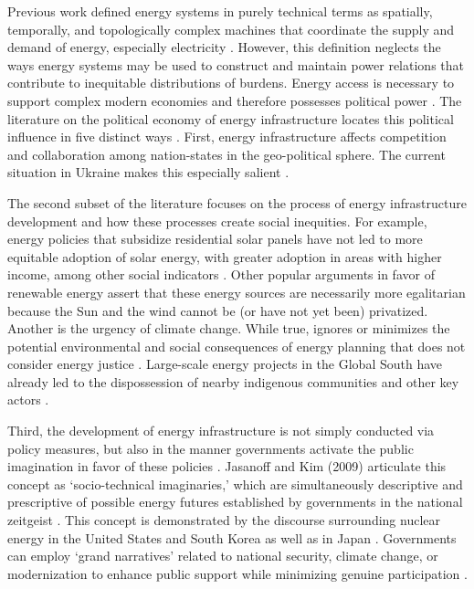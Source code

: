 Previous work defined energy systems in purely technical terms as spatially,
temporally, and topologically complex machines that coordinate the supply and
demand of energy, especially electricity \cite{dotson_influence_2022}. However,
this definition neglects the ways energy systems may be used to construct and
maintain power relations that contribute to inequitable distributions of
burdens. Energy access is necessary to support complex modern economies and
therefore possesses political power \cite{jones_building_2013,
bridge_energy_2018}. The literature on the political economy of energy
infrastructure locates this political influence in five distinct ways
\cite{bridge_energy_2018}. First, energy infrastructure affects competition and
collaboration among nation-states in the geo-political sphere. The current
situation in Ukraine makes this especially salient
\cite{figueiredo_impacts_2022}. 

The second subset of the literature focuses on the process of energy
infrastructure development and how these processes create social inequities. For
example, energy policies that subsidize residential solar panels have not led to
more equitable adoption of solar energy, with greater adoption in areas with
higher income, among other social indicators \cite{reames_distributional_2020}.
Other popular arguments in favor of renewable energy assert that these energy
sources are necessarily more egalitarian because the Sun and the wind cannot be
(or have not yet been) privatized. Another is the urgency of climate change.
While true, ignores or minimizes the potential environmental and social
consequences of energy planning that does not consider energy justice
\cite{jones_building_2013}. Large-scale energy projects in the Global South have
already led to the dispossession of nearby indigenous communities and other key
actors \cite{yenneti_spatial_2016, barragan-contreras_procedural_2022}.

Third, the development of energy infrastructure is not simply conducted via
policy measures, but also in the manner governments activate the public
imagination in favor of these policies
\cite{bridge_energy_2018,jasanoff_containing_2009}. Jasanoff and Kim (2009)
articulate this concept as `socio-technical imaginaries,' which are
simultaneously descriptive and prescriptive of possible energy futures
established by governments in the national zeitgeist
\cite{jasanoff_containing_2009}. This concept is demonstrated by the discourse
surrounding nuclear energy in the United States and South Korea
\cite{jasanoff_containing_2009} as well as in Japan
\cite{valentine_energy_2019}. Governments can employ `grand narratives' related
to national security, climate change, or modernization to enhance public support
while minimizing genuine participation \cite{bridge_energy_2018}.

